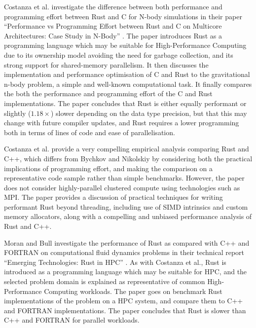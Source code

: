 Costanza et al. investigate the difference between both performance and programming effort between Rust and C for N-body simulations in their paper ``Performance vs Programming Effort between Rust and C on Multicore Architectures: Case Study in N-Body'' \cite{costanzoPerformanceVsProgramming2021}. The paper introduces Rust as a programming language which may be suitable for High-Performance Computing due to its ownership model avoiding the need for garbage collection, and its strong support for shared-memory parallelism. It then discusses the implementation and performance optimisation of C and Rust to the gravitational n-body problem, a simple and well-known computational task. It finally compares the both the performance and programming effort of the C and Rust implementations. The paper concludes that Rust is either equally performant or slightly ($1.18\times$) slower depending on the data type precision, but that this may change with future compiler updates, and Rust requires a lower programming both in terms of lines of code and ease of parallelisation.

Costanza et al. provide a very compelling empirical analysis comparing Rust and C++, which differs from Bychkov and Nikolskiy by considering both the practical implications of programming effort, and making the comparison on a representative code sample rather than simple benchmarks. However, the paper does not consider highly-parallel clustered compute using technologies such as MPI. The paper provides a discussion of practical techniques for writing performant Rust beyond threading, including use of SIMD intrinsics and custom memory allocators, along with a compelling and unbiased performance analysis of Rust and C++.


Moran and Bull \cite{moranEmergingTechnologiesRust2023} investigate the performance of Rust as compared with C++ and FORTRAN on computational fluid dynamics problems in their technical report ``Emerging Technologies: Rust in HPC'' \cite{moranEmergingTechnologiesRust2023}. As with Costanza et al., Rust is introduced as a programming language which may be suitable for HPC, and the selected problem domain is explained as representative of common High-Performance Computing workloads. The paper goes on benchmark Rust implementations of the problem on a HPC system, and compare them to C++ and FORTRAN implementations. The paper concludes that Rust is slower than C++ and FORTRAN for parallel workloads.

